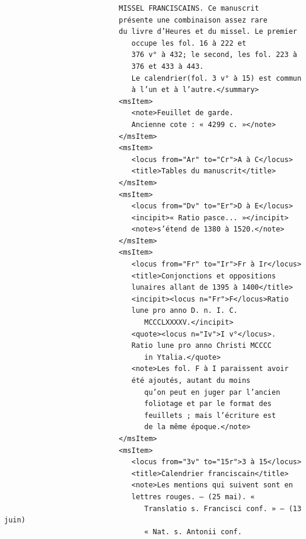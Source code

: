 \documentclass[a4paper,12pt,twoside]{book}
\begin{document}
\begin{verbatim}
                           MISSEL FRANCISCAINS. Ce manuscrit 
                           présente une combinaison assez rare 
                           du livre d’Heures et du missel. Le premier
                              occupe les fol. 16 à 222 et
                              376 v° à 432; le second, les fol. 223 à
                              376 et 433 à 443. 
                              Le calendrier(fol. 3 v° à 15) est commun
                              à l’un et à l’autre.</summary>
                           <msItem>
                              <note>Feuillet de garde. 
                              Ancienne cote : « 4299 c. »</note>
                           </msItem>
                           <msItem>
                              <locus from="Ar" to="Cr">A à C</locus>
                              <title>Tables du manuscrit</title>
                           </msItem>
                           <msItem>
                              <locus from="Dv" to="Er">D à E</locus>
                              <incipit>« Ratio pasce... »</incipit>
                              <note>s’étend de 1380 à 1520.</note>
                           </msItem>
                           <msItem>
                              <locus from="Fr" to="Ir">Fr à Ir</locus>
                              <title>Conjonctions et oppositions 
                              lunaires allant de 1395 à 1400</title>
                              <incipit><locus n="Fr">F</locus>Ratio 
                              lune pro anno D. n. I. C.
                                 MCCCLXXXXV.</incipit>
                              <quote><locus n="Iv">I v°</locus>. 
                              Ratio lune pro anno Christi MCCCC
                                 in Ytalia.</quote>
                              <note>Les fol. F à I paraissent avoir 
                              été ajoutés, autant du moins
                                 qu’on peut en juger par l’ancien 
                                 foliotage et par le format des
                                 feuillets ; mais l’écriture est 
                                 de la même époque.</note>
                           </msItem>
                           <msItem>
                              <locus from="3v" to="15r">3 à 15</locus>
                              <title>Calendrier franciscain</title>
                              <note>Les mentions qui suivent sont en 
                              lettres rouges. — (25 mai). «
                                 Translatio s. Francisci conf. » — (13 juin) 
                                 « Nat. s. Antonii conf.

\end{verbatim}
\end{document}
